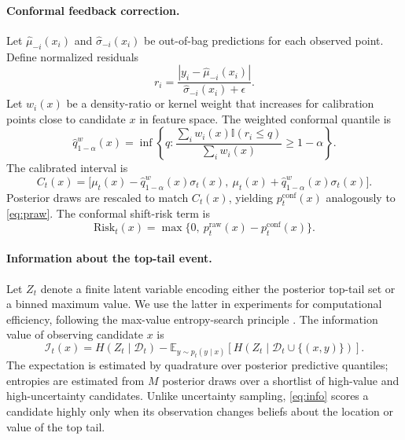 \documentclass{article}
\newcommand{\dset}{\mathcal D}
\newcommand{\E}{\mathbb E}
\newcommand{\I}{\mathbb I}
\begin{document}
\paragraph{Conformal feedback correction.} Let $\hat\mu_{-i}(x_i)$ and $\hat\sigma_{-i}(x_i)$ be out-of-bag predictions for each observed point. Define normalized residuals
\begin{equation}
r_i=\frac{|y_i-\hat\mu_{-i}(x_i)|}{\hat\sigma_{-i}(x_i)+\epsilon}.
\end{equation}
Let $w_i(x)$ be a density-ratio or kernel weight that increases for calibration points close to candidate $x$ in feature space. The weighted conformal quantile is
\begin{equation}
\hat q_{1-\alpha}^{w}(x)=\inf\left\{q:\frac{\sum_i w_i(x)\I(r_i\le q)}{\sum_i w_i(x)}\ge 1-\alpha\right\}.
\end{equation}
The calibrated interval is
\begin{equation}
C_t(x)=\big[\mu_t(x)-\hat q_{1-\alpha}^{w}(x)\sigma_t(x),~\mu_t(x)+\hat q_{1-\alpha}^{w}(x)\sigma_t(x)\big].
\end{equation}
Posterior draws are rescaled to match $C_t(x)$, yielding $p_t^{\mathrm{conf}}(x)$ analogously to \cref{eq:praw}. The conformal shift-risk term is
\begin{equation}
\mathrm{Risk}_t(x)=\max\{0,~p_t^{\mathrm{raw}}(x)-p_t^{\mathrm{conf}}(x)\}.
\end{equation}

\paragraph{Information about the top-tail event.} Let $Z_t$ denote a finite latent variable encoding either the posterior top-tail set or a binned maximum value. We use the latter in experiments for computational efficiency, following the max-value entropy-search principle \citep{wang2017mes}. The information value of observing candidate $x$ is
\begin{equation}
\label{eq:info}
\mathcal I_t(x)=H(Z_t\mid \dset_t)-\E_{y\sim p_t(y\mid x)}\left[H(Z_t\mid \dset_t\cup\{(x,y)\})\right].
\end{equation}
The expectation is estimated by quadrature over posterior predictive quantiles; entropies are estimated from $M$ posterior draws over a shortlist of high-value and high-uncertainty candidates. Unlike uncertainty sampling, \cref{eq:info} scores a candidate highly only when its observation changes beliefs about the location or value of the top tail.
\end{document}
